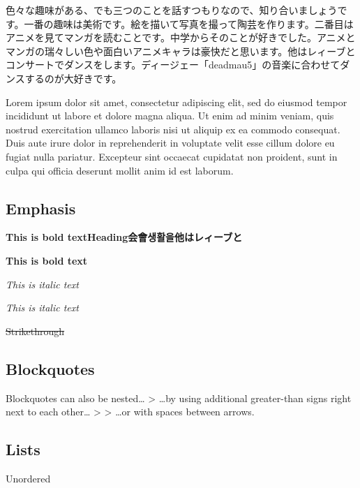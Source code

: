 \documentclass[
  paper=a4,
  ,captions=tableheading
]{scrartcl}
\renewcommand{\st}[1]{\sout{#1}}
\renewenvironment{quote}{\begin{customblockquote}\list{}{\rightmargin=0em\leftmargin=0em}%
\item\relax\color{blockquote-text}\ignorespaces}{\unskip\unskip\endlist\end{customblockquote}}
\begin{document}
色々な趣味がある、でも三つのことを話すつもりなので、知り合いましょうです。一番の趣味は美術です。絵を描いて写真を撮って陶芸を作ります。二番目はアニメを見てマンガを読むことです。中学からそのことが好きでした。アニメとマンガの瑞々しい色や面白いアニメキャラは豪快だと思います。他はレィーブとコンサートでダンスをします。ディージェー「deadmau5」の音楽に合わせてダンスするのが大好きです。

Lorem ipsum dolor sit amet, consectetur adipiscing elit, sed do eiusmod
tempor incididunt ut labore et dolore magna aliqua. Ut enim ad minim
veniam, quis nostrud exercitation ullamco laboris nisi ut aliquip ex ea
commodo consequat. Duis aute irure dolor in reprehenderit in voluptate
velit esse cillum dolore eu fugiat nulla pariatur. Excepteur sint
occaecat cupidatat non proident, sunt in culpa qui officia deserunt
mollit anim id est laborum.

\hypertarget{emphasis}{%
\subsection{Emphasis}\label{emphasis}}

\textbf{This is bold textHeading会會생활을他はレィーブと}

\textbf{This is bold text}

\emph{This is italic text}

\emph{This is italic text}

\st{Strikethrough}

\hypertarget{blockquotes}{%
\subsection{Blockquotes}\label{blockquotes}}

\begin{quote}
Blockquotes can also be nested\ldots{} \textgreater{} \ldots by using
additional greater-than signs right next to each other\ldots{}
\textgreater{} \textgreater{} \ldots or with spaces between arrows.
\end{quote}

\hypertarget{lists}{%
\subsection{Lists}\label{lists}}

Unordered
\end{document}
